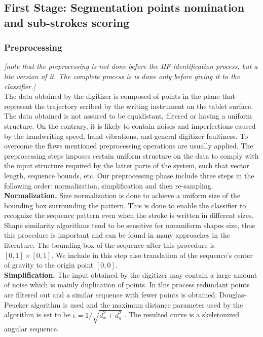 \documentclass[journal,compsoc]{IEEEtran}
\begin{document}
\subsection{First Stage: Segmentation points nomination and sub-strokes scoring}
\subsubsection{Preprocessing}
\label{preprocessing}

\emph{[note that the preprocessing is not done before the HF identification process, but a lite version of it. The complete process is is done only before giving it to the classifier.]}\\

The data obtained by the digitizer is composed of points in the plane that represent the trajectory scribed by the writing instrument on the tablet surface. The data obtained is not assured to be equidistant, filtered or having a uniform structure. On the contrary, it is likely to contain noises and imperfections caused by the handwriting speed, hand vibrations, and general digitizer faultiness.   
To overcome the flaws mentioned preprocessing operations are usually applied. The preprocessing steps imposes certain uniform structure on the data to comply with the input structure required by the latter parts of the system, such that vector length, sequence bounds, etc.
Our preprocessing phase include three steps in the following order: normalization, simplification and then re-sampling.\\

\textbf{Normalization.} Size normalization is done to achieve a uniform size of the bounding box surrounding the pattern. This is done to enable the classifier to recognize the sequence pattern even when the stroke is written in different sizes. Shape similarity algorithms tend to be sensitive for nonuniform shapes size, thus this procedure is important and can be found in many approaches in the literature. The bounding box of the sequence after this procedure is $[0,1]\times[0,1]$. We include in this step also translation of the sequence's center of gravity to the origin point $[0,0]$.\\

\textbf{Simplification.} The input obtained by the digitizer may contain a large amount of noise which is mainly duplication of points. In this process redundant points are filtered out and a similar sequence with fewer points is obtained. Douglas-Peucker algorithm is used and the maximum distance parameter used by the algorithm is set to be $\epsilon = 1/\sqrt{d_x^2+d_y^2}$ . The resulted curve is a skeletonized angular sequence.\\
\end{document}
